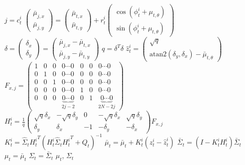 \documentclass[conference]{IEEEtran}
\begin{document}
\begin{algorithm}[htbp]
\begin{algorithmic}[1]
			\State $j = c_{t}^{i}$ 
				\State $\begin{pmatrix} \bar{\mu}_{j,x} \\ \bar{\mu}_{j,y} \end{pmatrix} = \begin{pmatrix} \bar{\mu}_{t,x} \\ \bar{\mu}_{t,y} \end{pmatrix} + r_{t}^{i}\begin{pmatrix} \cos(\phi_{t}^{i}+\mu_{t,\theta}) \\ \sin(\phi_{t}^{i}+\mu_{t,\theta}) \end{pmatrix}$
			\EndIf
			\State $\delta = \begin{pmatrix} \delta_{x} \\ \delta_{y} \end{pmatrix} = \begin{pmatrix} \bar{\mu}_{j,x}-\bar{\mu}_{t,x} \\ \bar{\mu}_{j,y}-\bar{\mu}_{t,y} \end{pmatrix}$
			\State $q = \delta^{T}\delta$
			\State $\hat{z}_{t}^{i} = \begin{pmatrix} \sqrt{q} \\ \mathrm{atan2}(\delta_{y},\delta_{x})-\bar{\mu}_{t,\theta} \end{pmatrix}$
			\State $F_{x,j} = \begin{pmatrix} 1 & 0 & 0 & 0 \cdots 0 & 0 & 0 & 0 \cdots 0 \\ 0 & 1 & 0 & 0 \cdots 0 & 0 & 0 & 0 \cdots 0 \\ 0 & 0 & 1 & 0 \cdots 0 & 0 & 0 & 0 \cdots 0 \\ 0 & 0 & 0 & 0 \cdots 0 & 1 & 0 & 0 \cdots 0 \\ 0 & 0 & 0 & \underbrace{0 \cdots 0}_{2j-2} & 0 & 1 & \underbrace{0 \cdots 0}_{2N-2j} \end{pmatrix}$
			\State $H_{t}^{i} = \frac{1}{q} \begin{pmatrix} \sqrt{q}\delta_{x} & -\sqrt{q}\delta_{y} & 0 & -\sqrt{q}\delta_{x} & \sqrt{q}\delta_{y} \\ \delta_{y} & \delta_{x} & -1 & -\delta_{y} & -\delta_{x} \end{pmatrix} F_{x,j}$
			\State $K_{t}^{i} = \hat{\Sigma}_{t}{H_{t}^{i}}^{T}(H_{t}^{i}\hat{\Sigma}_{t}{H_{t}^{i}}^{T} + Q_{t})^{-1}$
			\State $\bar{\mu}_{t} = \bar{\mu}_{t} + K_{t}^{i}(z_{t}^{i} - \hat{z}_{t}^{i})$
			\State $\bar{\Sigma}_{t} = (I-K_{t}^{i}H_{t}^{i})\bar{\Sigma}_{t}$
		\EndFor
		\State $\mu_{t} = \bar{\mu}_{t}$
		\State $\Sigma_{t} = \bar{\Sigma}_{t}$
		\Ensure $\mu_{t}$, $\Sigma_{t}$
	\end{algorithmic}
\end{algorithm}
\end{document}
